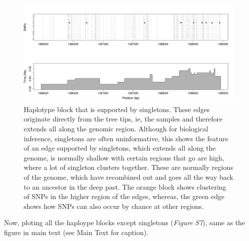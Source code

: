 \documentclass[
]{article}
\begin{document}
\begin{figure}

{\centering \includegraphics{figS7} 

}

\caption{ \footnotesize Haplotype block that is supported by singletons. These edges originate directly from the tree tips, ie, the samples and therefore extends all along the genomic region. Although for biological inference, singletons are often uninformative, this shows the feature of an edge supported by singletons, which extends all along the genome, is normally shallow with certain regions that go are high, where a lot of singleton clusters together. These are normally regions of the genome, which have recombined out and goes all the way back to an ancestor in the deep past. The orange block shows clustering of SNPs in the higher region of the edges, whereas, the green edge shows how SNPs can also occur by chance at other regions.}\label{fig:fig S7 - singleton hap block}
\end{figure}

Now, ploting all the haploype blocks except singletons (\emph{Figure
S7}), same as the figure in main text (see Main Text for caption).
\end{document}
